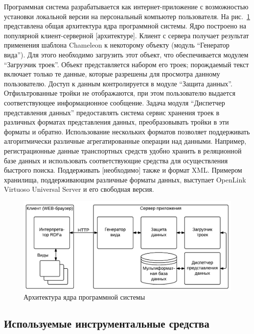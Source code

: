 \documentclass[utf8]{../IncArticle}
\newcommand{\e}[2][fcolor]{\textcolor{pcolor}{[}\textcolor{#1}{#2}\textcolor{pcolor}{]}}
\begin{document}
Программная система разрабатывается как интернет-приложение с
возможностью установки локальной версии на персональный компьютер
пользователя.  На рис.~\ref{architecture} представлена общая
архитектура ядра программной системы.  Ядро построено на популярной
клиент-серверной \e{архитектуре}.  Клиент с сервера получает результат
применения шаблона Chameleon к некоторому объекту (модуль ``Генератор
вида'').  Для этого необходимо загрузить этот объект, что
обеспечивается модулем ``Загрузчик троек''.  Объект представляется
набором его троек; порождаемый текст включает только те данные,
которые разрешены для просмотра данному пользователю.  Доступ к данным
контролируется в модуле ``Защита данных''.  Отфильтрованные тройки не
отображаются, при этом пользователю выдается соответствующее
информационное сообщение.  Задача модуля ``Диспетчер представления
данных'' предоставлять система сервис хранения троек в различных форматах
представления данных, преобразовывать тройки в эти форматы и обратно.
Использование нескольких форматов позволяет поддерживать
алгоритмически различные агрегатированные операции над данными.
Например, регистрационные данные транспортных средств удобно хранить в
реляционной базе данных и использовать соответствующие средства для
осуществления быстрого поиска.  Поддерживать \e{необходимо} также и
формат XML.  Примером хранилища, поддерживающим различные форматы
данных, выступает  OpenLink Virtuoso Universal Server \cite{b2:8} и
его свободная версия.

\begin{figure}[!t]
\centering
\includegraphics[width=0.8\linewidth]{peixe-architecture-ru-1.pdf}
\caption{Архитектура ядра программной системы}
\label{architecture}
\end{figure}

\subsection{Используемые инструментальные средства}
\label{sec:instr}
\end{document}
